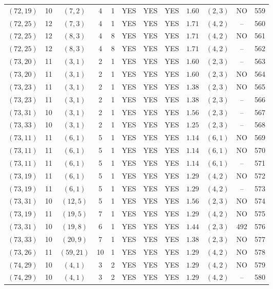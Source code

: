 \begin{longtable}{|c|c|c|c|c|c|c|c|c|c|c|c|}
$(72,19)$ & 10 & $(7,2)$ & 4 & 1 & YES & YES & YES & $1.60$ & $(2,3)$ & NO & 559\\
$(72,25)$ & 12 & $(7,3)$ & 4 & 1 & YES & YES & YES & $1.71$ & $(4,2)$ & -- & 560\\
$(72,25)$ & 12 & $(8,3)$ & 4 & 8 & YES & YES & YES & $1.71$ & $(4,2)$ & NO & 561\\
$(72,25)$ & 12 & $(8,3)$ & 4 & 8 & YES & YES & YES & $1.71$ & $(4,2)$ & -- & 562\\
$(73,20)$ & 11 & $(3,1)$ & 2 & 1 & YES & YES & YES & $1.60$ & $(2,3)$ & -- & 563\\
$(73,20)$ & 11 & $(3,1)$ & 2 & 1 & YES & YES & YES & $1.60$ & $(2,3)$ & NO & 564\\
$(73,23)$ & 11 & $(3,1)$ & 2 & 1 & YES & YES & YES & $1.38$ & $(2,3)$ & NO & 565\\
$(73,23)$ & 11 & $(3,1)$ & 2 & 1 & YES & YES & YES & $1.38$ & $(2,3)$ & -- & 566\\
$(73,31)$ & 10 & $(3,1)$ & 2 & 1 & YES & YES & YES & $1.56$ & $(2,3)$ & -- & 567\\
$(73,33)$ & 10 & $(3,1)$ & 2 & 1 & YES & YES & YES & $1.25$ & $(2,3)$ & -- & 568\\
$(73,11)$ & 11 & $(6,1)$ & 5 & 1 & YES & YES & YES & $1.14$ & $(6,1)$ & NO & 569\\
$(73,11)$ & 11 & $(6,1)$ & 5 & 1 & YES & YES & YES & $1.14$ & $(6,1)$ & NO & 570\\
$(73,11)$ & 11 & $(6,1)$ & 5 & 1 & YES & YES & YES & $1.14$ & $(6,1)$ & -- & 571\\
$(73,19)$ & 11 & $(6,1)$ & 5 & 1 & YES & YES & YES & $1.29$ & $(4,2)$ & NO & 572\\
$(73,19)$ & 11 & $(6,1)$ & 5 & 1 & YES & YES & YES & $1.29$ & $(4,2)$ & -- & 573\\
$(73,31)$ & 10 & $(12,5)$ & 5 & 1 & YES & YES & YES & $1.56$ & $(2,3)$ & NO & 574\\
$(73,19)$ & 11 & $(19,5)$ & 7 & 1 & YES & YES & YES & $1.29$ & $(4,2)$ & NO & 575\\
$(73,31)$ & 10 & $(19,8)$ & 6 & 1 & YES & YES & YES & $1.44$ & $(2,3)$ & 492 & 576\\
$(73,33)$ & 10 & $(20,9)$ & 7 & 1 & YES & YES & YES & $1.38$ & $(2,3)$ & NO & 577\\
$(73,26)$ & 11 & $(59,21)$ & 10 & 1 & YES & YES & YES & $1.29$ & $(4,2)$ & NO & 578\\
$(74,29)$ & 10 & $(4,1)$ & 3 & 2 & YES & YES & YES & $1.29$ & $(4,2)$ & NO & 579\\
$(74,29)$ & 10 & $(4,1)$ & 3 & 2 & YES & YES & YES & $1.29$ & $(4,2)$ & -- & 580\\

\end{longtable}
